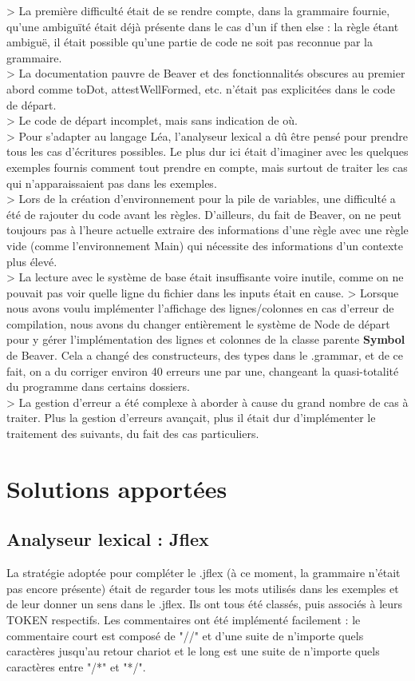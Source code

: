 \documentclass{article}
\begin{document}
> La première difficulté était de se rendre compte, dans la grammaire fournie, qu'une ambiguïté était déjà présente dans le cas d'un if then else : la règle étant ambiguë, il était possible qu'une partie de code ne soit pas reconnue par la grammaire.\\
> La documentation pauvre de Beaver et des fonctionnalités obscures au premier abord comme toDot, attestWellFormed, etc. n'était pas explicitées dans le code de départ.\\
> Le code de départ incomplet, mais sans indication de où.\\
> Pour s'adapter au langage Léa, l'analyseur lexical a dû être pensé pour prendre tous les cas d'écritures possibles. Le plus dur ici était d'imaginer avec les quelques exemples fournis comment tout prendre en compte, mais surtout de traiter les cas qui n'apparaissaient pas dans les exemples.\\
> Lors de la création d'environnement pour la pile de variables, une difficulté a été de rajouter du code avant les règles. D'ailleurs, du fait de Beaver, on ne peut toujours pas à l'heure actuelle extraire des informations d'une règle avec une règle vide (comme l'environnement Main) qui nécessite des informations d'un contexte plus élevé.\\
> La lecture avec le système de base était insuffisante voire inutile, comme on ne pouvait pas voir quelle ligne du fichier dans les inputs était en cause.
> Lorsque nous avons voulu implémenter l'affichage des lignes/colonnes en cas d'erreur de compilation, nous avons du changer entièrement le système de Node de départ pour y gérer l'implémentation des lignes et colonnes de la classe parente \textbf{Symbol} de Beaver. Cela a changé des constructeurs, des types dans le .grammar, et de ce fait, on a du corriger environ 40 erreurs une par une, changeant la quasi-totalité du programme dans certains dossiers.\\
> La gestion d'erreur a été complexe à aborder à cause du grand nombre de cas à traiter. Plus la gestion d'erreurs avançait, plus il était dur d'implémenter le traitement des suivants, du fait des cas particuliers.\\

\newpage

\section{Solutions apportées}
\subsection{Analyseur lexical : Jflex}
La stratégie adoptée pour compléter le .jflex (à ce moment, la grammaire n'était pas encore présente) était de regarder tous les mots utilisés dans les exemples et de leur donner un sens dans le .jflex. Ils ont tous été classés, puis associés à leurs TOKEN respectifs. Les commentaires ont été implémenté facilement : le commentaire court est composé de "//" et d'une suite de n'importe quels caractères jusqu'au retour chariot et le long est une suite de n'importe quels caractères entre "/*" et "*/".
\end{document}
